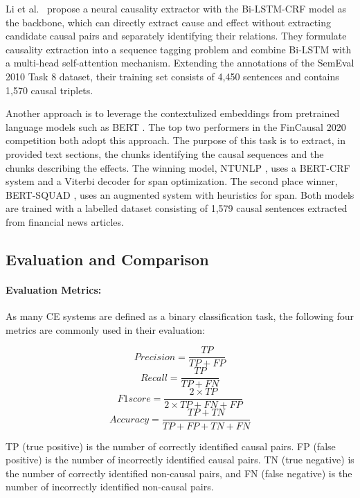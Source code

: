 Li et al.~\cite{Li21BiLSTMCRF} propose a neural causality extractor with the Bi-LSTM-CRF model as the backbone, which can directly extract cause and effect without extracting candidate causal pairs and separately identifying their relations. They formulate causality extraction into a sequence tagging problem and combine Bi-LSTM with a multi-head self-attention mechanism. Extending the annotations of the SemEval 2010 Task 8 dataset, their training set consists of 4,450 sentences and contains 1,570 causal triplets.

Another approach is to leverage the contextulized embeddings from pretrained language models such as BERT \cite{BERT2018}. The top two performers in the FinCausal 2020 competition \cite{FinCausal20} both adopt this approach. The purpose of this task is to extract, in provided text sections, the chunks identifying the causal sequences and the chunks describing the effects. The winning model, NTUNLP \cite{NTUNLPL20}, uses a BERT-CRF system and a Viterbi decoder for span optimization. The second place winner, BERT-SQUAD \cite{GBE20}, uses an augmented system with heuristics for span. Both models are trained with a labelled dataset consisting of 1,579 causal sentences extracted from financial news articles. 


\subsection {Evaluation and Comparison}

\paragraph{Evaluation Metrics:} As many CE systems are defined as a binary classification task, the following four metrics \cite{Jurafsky2009} are commonly used in their evaluation:

\[Precision = \frac{TP} {TP + FP} \]
\[Recall = \frac{TP}{TP + FN} \]
\[F1 score = \frac{2 \times TP} {2 \times TP + FN + FP}\]
\[Accuracy = \frac{TP + TN} {TP + FP + TN + FN}\]

TP (true positive) is the number of correctly identified causal pairs. FP (false positive) is the number of incorrectly identified causal pairs. TN (true negative) is the number of correctly identified non-causal pairs, and FN (false negative) is the number of incorrectly identified non-causal pairs. 

